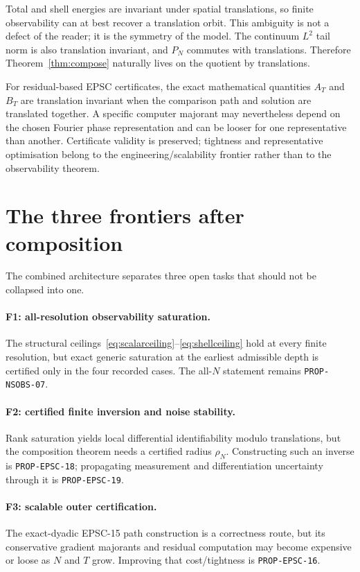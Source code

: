 \documentclass[11pt]{article}
\theoremstyle{definition}
\begin{document}
Total and shell energies are invariant under spatial translations, so finite observability can at
best recover a translation orbit.  This ambiguity is not a defect of the reader; it is the symmetry
of the model.  The continuum $L^2$ tail norm is also translation invariant, and $P_N$ commutes with
translations.  Therefore Theorem~\ref{thm:compose} naturally lives on the quotient by translations.

For residual-based EPSC certificates, the exact mathematical quantities $A_T$ and $B_T$ are
translation invariant when the comparison path and solution are translated together.  A specific
computer majorant may nevertheless depend on the chosen Fourier phase representation and can be
looser for one representative than another.  Certificate validity is preserved; tightness and
representative optimisation belong to the engineering/scalability frontier rather than to the
observability theorem.

\section{The three frontiers after composition}

The combined architecture separates three open tasks that should not be collapsed into one.

\paragraph{F1: all-resolution observability saturation.}
The structural ceilings~\eqref{eq:scalarceiling}--\eqref{eq:shellceiling} hold at every finite
resolution, but exact generic saturation at the earliest admissible depth is certified only in the
four recorded cases.  The all-$N$ statement remains \texttt{PROP-NSOBS-07}.

\paragraph{F2: certified finite inversion and noise stability.}
Rank saturation yields local differential identifiability modulo translations, but the composition
theorem needs a certified radius $\rho_N$.  Constructing such an inverse is
\texttt{PROP-EPSC-18}; propagating measurement and differentiation uncertainty through it is
\texttt{PROP-EPSC-19}.

\paragraph{F3: scalable outer certification.}
The exact-dyadic EPSC-15 path construction is a correctness route, but its conservative gradient
majorants and residual computation may become expensive or loose as $N$ and $T$ grow.  Improving
that cost/tightness is \texttt{PROP-EPSC-16}.
\end{document}
